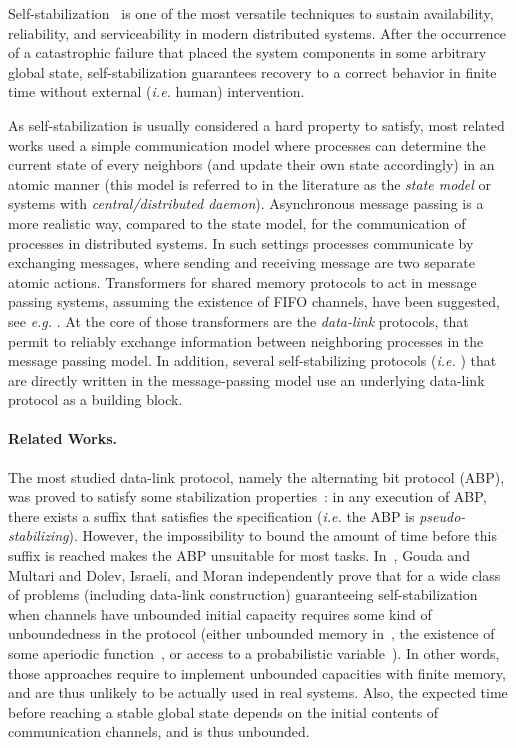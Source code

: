 \documentclass[11pt]{article}
\begin{document}
Self-stabilization~\cite{D74j,D00b,T09bc} is one of the most versatile techniques to sustain availability, reliability, and serviceability in modern distributed systems. After the occurrence of a catastrophic failure that placed the system components in some arbitrary global state, self-stabilization guarantees recovery to a correct behavior in finite time without external (\emph{i.e.} human) intervention. 

As self-stabilization is usually considered a hard property to satisfy, most related works used a simple communication model where processes can determine the current state of every neighbors (and update their own state accordingly) in an atomic manner (this model is referred to in the literature as the \emph{state model} or systems with \emph{central/distributed daemon}). Asynchronous message passing is a more realistic way, compared to the state model, for the communication of processes in distributed systems. In such settings processes communicate by exchanging messages, where sending and receiving message are two separate atomic actions. Transformers for shared memory protocols to act in message passing systems, assuming the existence of FIFO channels, have been suggested, see \emph{e.g.} \cite{DIM93j,D00b}. At the core of those transformers are the \emph{data-link} protocols, that permit to reliably exchange information between neighboring processes in the message passing model. In addition, several self-stabilizing protocols (\emph{i.e.} \cite{DT06c,AADDPT10c}) that are directly written in the message-passing model use an underlying data-link protocol as a building block.

\paragraph{Related Works.} The most studied data-link protocol, namely the alternating bit protocol (ABP), was proved to satisfy some stabilization properties~\cite{AB93j,DIM97j,BGM93j}: in any execution of ABP, there exists a suffix that satisfies the specification (\emph{i.e.} the ABP is \emph{pseudo-stabilizing}). However, the impossibility to bound the amount of time before this suffix is reached makes the ABP unsuitable for most tasks. In~\cite{GM91j,DIM93j}, Gouda and Multari and Dolev, Israeli, and Moran independently prove that for a wide class of problems (including data-link construction) guaranteeing self-stabilization when channels have unbounded initial capacity requires some kind of unboundedness in the protocol (either unbounded memory in~\cite{GM91j}, the existence of some aperiodic function~\cite{AB93j}, or access to a probabilistic variable~\cite{AB93j}). In other words, those approaches require to implement unbounded capacities with finite memory, and are thus unlikely to be actually used in real systems. Also, the expected time before reaching a stable global state depends on the initial contents of communication channels, and is thus unbounded.
\end{document}
